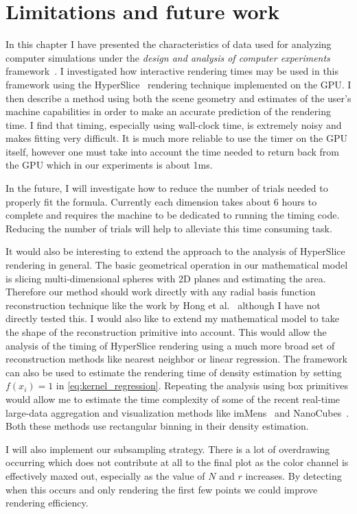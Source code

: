 \section{Limitations and future work}

In this chapter I have presented the characteristics of data used for
analyzing computer simulations under the 
\emph{design and analysis of computer experiments} 
framework~\cite{Santner:2003}.  I investigated
how interactive rendering times may be used in this framework using the
HyperSlice~\cite{Wijk:1993} rendering technique implemented on the GPU.
I then describe a method using both the scene geometry and estimates of the
user's machine capabilities in order to make an accurate prediction of 
the rendering time.
I find that timing, especially using wall-clock time, is extremely noisy
and makes fitting very difficult.  It is much more reliable to use the
timer on the GPU itself, however one must take into account the time needed
to return back from the GPU which in our experiments is about 1ms.

In the future, I will investigate how to reduce the number of trials
needed to properly fit the formula.  Currently each dimension
takes about 6 hours to complete and requires the machine to be dedicated
to running the timing code.  Reducing the number of trials will help to
alleviate this time consuming task.

It would also be interesting to extend the approach to the analysis of
HyperSlice rendering in general. The basic geometrical operation in our
mathematical model is slicing multi-dimensional spheres with 2D planes and
estimating the area. Therefore our method should work directly with any radial
basis function reconstruction technique like the work by Hong et
al.~\cite{Hong:2006} although I have not directly tested this.  I would also
like to extend my mathematical model to take the shape of the reconstruction
primitive into account. This would allow the analysis of the timing of HyperSlice
rendering using a much more broad set of reconstruction methods like 
nearest neighbor or linear regression. 
The framework can also be used to estimate the rendering time of density
estimation by setting $f(x_i) = 1$ in \autoref{eq:kernel_regression}. Repeating the
analysis using box primitives would allow me to estimate the time complexity
of some of the recent real-time large-data aggregation and visualization 
methods like imMens~\cite{Liu:2013} and NanoCubes~\cite{Lins:2013}. Both these
methods use rectangular binning in their density estimation.

I will also implement our subsampling strategy.
There is a lot of overdrawing occurring which does not contribute at
all to the final plot as the color channel is effectively maxed out, 
especially as the value of $N$ and $r$ increases.  By detecting when this 
occurs and only rendering the first few points we could improve rendering
efficiency.

